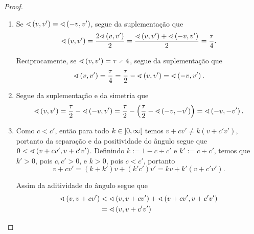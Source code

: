 \begin{proposition}
\begin{enumerate}
	\end{enumerate}
\end{proposition}
\begin{proof}
	\begin{enumerate}
		\item Se $\sphericalangle\left({v},{v'}\right)=\sphericalangle\left({-v},{v'}\right)$, segue da suplementação que
			\begin{equation*}
				\sphericalangle\left({v},{v'}\right) = \frac{2\sphericalangle\left({v},{v'}\right)}{2} = \frac{\sphericalangle\left({v},{v'}\right)+\sphericalangle\left({-v},{v'}\right)}{2} = \frac{\tau}{4}.
			\end{equation*}

			Reciprocamente, se $\ang{v}{v'}=\tau \div 4$, segue da suplementação que
				\begin{equation*}
					\sphericalangle\left({v},{v'}\right) = \frac{\tau}{4} = \frac{\tau}{2} - \sphericalangle\left({v},{v'}\right) = \sphericalangle\left({-v},{v'}\right).
				\end{equation*}
		
		\item Segue da suplementação e da simetria que
				\begin{equation*}
					\sphericalangle\left({v},{v'}\right) = \frac{\tau}{2} - \sphericalangle\left({-v},{v'}\right) = \frac{\tau}{2} - \left(\frac{\tau}{2} - \sphericalangle\left({-v},{-v'}\right)\right) = \sphericalangle\left({-v},{-v'}\right).
				\end{equation*}
		
		\item Como $c<c'$, então para todo $k \in \left]{0},{\infty}\right[$ temos $v+cv' \neq k(v+c'v')$, portanto da separação e da positividade do ângulo segue que $0 < \sphericalangle\left({v+cv'},{v+c'v'}\right)$. Definindo $k := 1 - c \div c'$ e $k' := c \div c'$, temos que $k'>0$, pois $c,c'>0$, e $k>0$, pois $c<c'$, portanto
				\begin{equation*}
					v+cv' = (k+k')v + (k'c')v'= kv+k'(v+c'v').
				\end{equation*}

		Assim da aditividade do ângulo segue que
				\begin{align*}
					\sphericalangle\left({v},{v+cv'}\right) &< \sphericalangle\left({v},{v+cv'}\right) + \sphericalangle\left({v+cv'},{v+c'v'}\right) \\
						&= \sphericalangle\left({v},{v+c'v'}\right)
				\end{align*}
		

\end{enumerate}
\end{proof}
